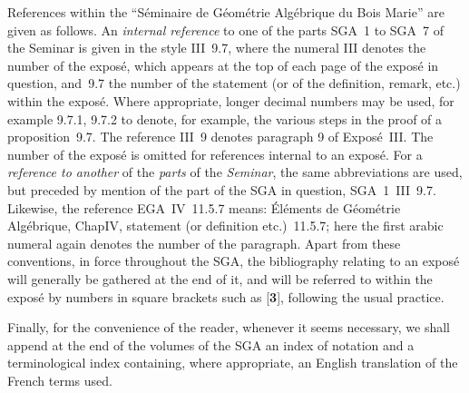 References within the ``S\'eminaire de G\'eom\'etrie Alg\'ebrique du
Bois Marie'' are given as follows. An \emph{internal reference} to one
of the parts SGA~1 to SGA~7 of the Seminar is given in the style
III~9.7, where the numeral III denotes the number of the expos\'e, which
appears at the top of each page of the expos\'e in question, and~9.7 the
number of the statement (or of the definition, remark, etc.) within the
expos\'e. Where appropriate, longer decimal numbers may be used, for
example 9.7.1, 9.7.2 to denote, for example, the various steps in the
proof of a proposition~9.7. The reference III~9 denotes paragraph 9 of
Expos\'e~III. The number of the expos\'e is omitted for references internal
to an expos\'e. For a \emph{reference to another} of the \emph{parts} of
the \emph{Seminar}, the same abbreviations are used, but preceded by mention
of the part of the SGA in question, SGA~1~III~9.7. Likewise, the
reference EGA~IV~11.5.7 means: \'El\'ements de G\'eom\'etrie
Alg\'ebrique, Chap\ptbl IV, statement (or definition etc.)~11.5.7; here
the first arabic numeral again denotes the number of the paragraph.
Apart from these conventions, in force throughout the SGA, the
bibliography relating to an expos\'e will generally be gathered at the end
of it, and will be referred to within the expos\'e by numbers in square
brackets such as [\textbf{3}], following the usual practice.

Finally, for the convenience of the reader, whenever it seems necessary,
we shall append at the end of the volumes of the SGA an index of
notation and a terminological index containing, where appropriate, an
English translation of the French terms used.

